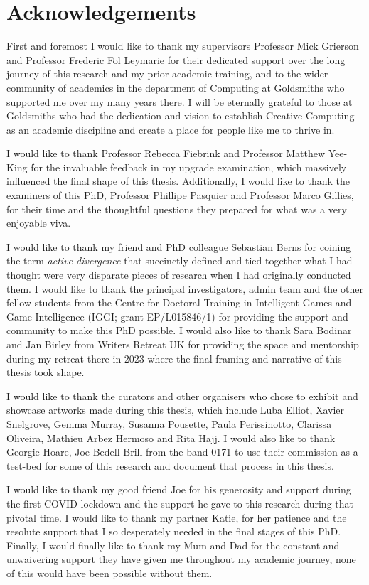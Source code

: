 \chapter*{Acknowledgements}

First and foremost I would like to thank my supervisors Professor Mick Grierson and Professor Frederic Fol Leymarie for their dedicated support over the long journey of this research and my prior academic training, and to the wider community of academics in the department of Computing at Goldsmiths who supported me over my many years there. I will be eternally grateful to those at Goldsmiths who had the dedication and vision to establish Creative Computing as an academic discipline and create a place for people like me to thrive in. 

I would like to thank Professor Rebecca Fiebrink and Professor Matthew Yee-King for the invaluable feedback in my upgrade examination, which massively influenced the final shape of this thesis. Additionally, I would like to thank the examiners of this PhD, Professor Phillipe Pasquier and Professor Marco Gillies, for their time and the thoughtful questions they prepared for what was a very enjoyable viva. 

I would like to thank my friend and PhD colleague Sebastian Berns for coining the term \textit{active divergence} that succinctly defined and tied together what I had thought were very disparate pieces of research when I had originally conducted them. I would like to thank the principal investigators, admin team and the other fellow students from the Centre for Doctoral Training in Intelligent Games and Game Intelligence (IGGI; grant EP/L015846/1) for providing the support and community to make this PhD possible. I would also like to thank Sara Bodinar and Jan Birley from Writers Retreat UK for providing the space and mentorship during my retreat there in 2023 where the final framing and narrative of this thesis took shape. 

I would like to thank the curators and other organisers who chose to exhibit and showcase artworks made during this thesis, which include Luba Elliot, Xavier Snelgrove, Gemma Murray, Susanna Pousette, Paula Perissinotto, Clarissa Oliveira, Mathieu Arbez Hermoso and Rita Hajj. I would also like to thank Georgie Hoare, Joe Bedell-Brill from the band 0171 to use their commission as a test-bed for some of this research and document that process in this thesis.

I would like to thank my good friend Joe for his generosity and support during the first COVID lockdown and the support he gave to this research during that pivotal time. I would like to thank my partner Katie, for her patience and the resolute support that I so desperately needed in the final stages of this PhD. Finally, I would finally like to thank my Mum and Dad for the constant and unwaivering support they have given me throughout my academic journey, none of this would have been possible without them. 

